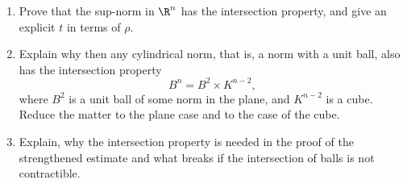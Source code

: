 \documentclass[a4paper,12pt]{report}
\begin{document}
\begin{task}
\begin{enumerate}[label=\textup{(\alph*)}]
\item Prove that the sup-norm in $\R^n$ has the intersection property, and give an explicit $t$ in terms of $\rho$.
\item Explain why then any cylindrical norm, that is, a norm with a unit ball, also has the intersection property
\[
B^n = B^2 \times K^{n-2},
\]
where $B^2$ is a unit ball of some norm in the plane, and $K^{n-2}$ is a cube. Reduce the matter to the plane case and to the case of the cube.
\item Explain\textup{,} why the intersection property is needed in the proof of the strengthened estimate and what breaks if the intersection of balls is not contractible.
\end{enumerate}

\end{task}
\end{document}
